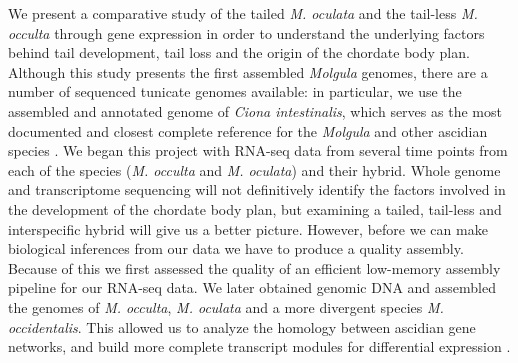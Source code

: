 We present a comparative study of the tailed \textit{M. oculata} and the tail-less \textit{M. occulta} through gene expression in order to understand the underlying factors behind tail development, tail loss and the origin of the chordate body plan. Although this study presents the first assembled \textit{Molgula} genomes, there are a number of sequenced tunicate genomes available: in particular, we use the assembled and annotated genome of \textit{Ciona intestinalis}, which serves as the most documented and closest complete reference for the \textit{Molgula} and other ascidian species \cite{dehal_draft_2002,satoh_ascidian_2003,satoh_ciona_2003}. We began this project with RNA-seq data from several time points from each of the species (\textit{M. occulta} and \textit{M. oculata}) and their hybrid. 
Whole genome and transcriptome sequencing will not definitively identify the factors involved in the development of the chordate body plan, but examining a tailed, tail-less and interspecific hybrid will give us a better picture. However, before we can make biological inferences from our data we have to produce a quality assembly. Because of this we first assessed the quality of an efficient low-memory assembly pipeline for our RNA-seq data.
We later obtained genomic DNA and assembled the genomes of \textit{M. occulta}, \textit{M. oculata} and a more divergent species \textit{M. occidentalis}. This allowed us to analyze the homology between ascidian gene networks, and build more complete transcript modules for differential expression \cite{vijay_challenges_2012}.

